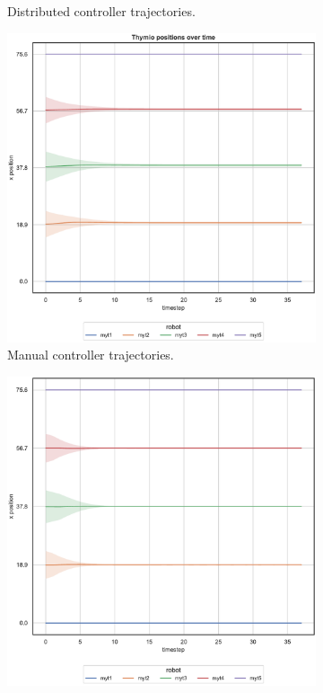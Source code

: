 \begin{figure}[H]
\begin{center}
\begin{subfigure}[h]{0.49\textwidth}
			\caption{Distributed controller trajectories.}
		\end{subfigure}
	\end{center}
	\begin{center}
		\begin{subfigure}[h]{0.49\textwidth}
			\centering			
			\includegraphics[width=.9\textwidth]{contents/images/net-d1/position-overtime-manual}%
			\caption{Manual controller trajectories.}
		\end{subfigure}
		\hfill
		\begin{subfigure}[h]{0.49\textwidth}
			\centering
			\includegraphics[width=.9\textwidth]{contents/images/net-c1/position-overtime-learned_communication}

\end{subfigure}
\end{center}
\end{figure}
